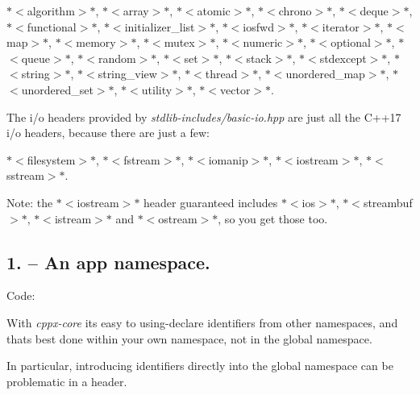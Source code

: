 \begin{DoxyItemize}
\item $\ast$$<$algorithm$>$$\ast$, $\ast$$<$array$>$$\ast$, $\ast$$<$atomic$>$$\ast$, $\ast$$<$chrono$>$$\ast$, $\ast$$<$deque$>$$\ast$, $\ast$$<$functional$>$$\ast$, $\ast$$<$initializer\+\_\+list$>$$\ast$, $\ast$$<$iosfwd$>$$\ast$, $\ast$$<$iterator$>$$\ast$, $\ast$$<$map$>$$\ast$, $\ast$$<$memory$>$$\ast$, $\ast$$<$mutex$>$$\ast$, $\ast$$<$numeric$>$$\ast$, $\ast$$<$optional$>$$\ast$, $\ast$$<$queue$>$$\ast$, $\ast$$<$random$>$$\ast$, $\ast$$<$set$>$$\ast$, $\ast$$<$stack$>$$\ast$, $\ast$$<$stdexcept$>$$\ast$, $\ast$$<$string$>$$\ast$, $\ast$$<$string\+\_\+view$>$$\ast$, $\ast$$<$thread$>$$\ast$, $\ast$$<$unordered\+\_\+map$>$$\ast$, $\ast$$<$unordered\+\_\+set$>$$\ast$, $\ast$$<$utility$>$$\ast$, $\ast$$<$vector$>$$\ast$.
\end{DoxyItemize}

The i/o headers provided by {\itshape stdlib-\/includes/basic-\/io.\+hpp} are just all the C++17 i/o headers, because there are just a few\+:


\begin{DoxyItemize}
\item $\ast$$<$filesystem$>$$\ast$, $\ast$$<$fstream$>$$\ast$, $\ast$$<$iomanip$>$$\ast$, $\ast$$<$iostream$>$$\ast$, $\ast$$<$sstream$>$$\ast$.
\end{DoxyItemize}

Note\+: the $\ast$$<$iostream$>$$\ast$ header guaranteed includes $\ast$$<$ios$>$$\ast$, $\ast$$<$streambuf$>$$\ast$, $\ast$$<$istream$>$$\ast$ and $\ast$$<$ostream$>$$\ast$, so you get those too.

\subsection*{1. – An {\ttfamily app} namespace.}

Code\+:


\begin{DoxyCode}{0}
\DoxyCodeLine{\{}
\DoxyCodeLine{\}  \textcolor{comment}{// namespace app}}
\end{DoxyCode}


With {\itshape cppx-\/core} it\textquotesingle{}s easy to {\ttfamily using}-\/declare identifiers from other namespaces, and that\textquotesingle{}s best done within your own namespace, not in the global namespace.

In particular, introducing identifiers directly into the global namespace can be problematic in a header.


